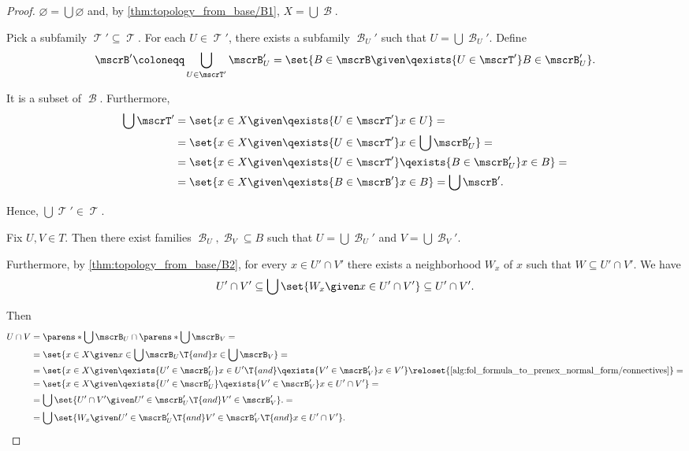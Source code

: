 \begin{proof}

   \( \varnothing = \bigcup \varnothing \) and, by \ref{thm:topology_from_base/B1}, \( X = \bigcup \mscrB \).

   Pick a subfamily \( \mscrT' \subseteq \mscrT \). For each \( U \in \mscrT' \), there exists a subfamily \( \mscrB_U' \) such that \( U = \bigcup \mscrB_U' \). Define
  \begin{equation*}
    \mscrB'
    \coloneqq
    \bigcup_{U \in \mscrT'} \mscrB_U'
    =
    \set{ B \in \mscrB \given \qexists {U \in \mscrT'} B \in \mscrB_U' }.
  \end{equation*}

  It is a subset of \( \mscrB \). Furthermore,
  \begin{align*}
    \bigcup \mscrT'
    &=
    \set{ x \in X \given \qexists{U \in \mscrT'} x \in U }
    = \\ &=
    \set{ x \in X \given \qexists{U \in \mscrT'} x \in \bigcup \mscrB_U' }
    = \\ &=
    \set{ x \in X \given \qexists{U \in \mscrT'} \qexists{B \in \mscrB_U'} x \in B }
    = \\ &=
    \set{ x \in X \given \qexists{B \in \mscrB'} x \in B }
    =
    \bigcup \mscrB'.
  \end{align*}

  Hence, \( \bigcup\mscrT' \in \mscrT \).

   Fix \( U, V \in T \). Then there exist families \( \mscrB_U, \mscrB_V \subseteq B \) such that \( U = \bigcup \mscrB_U' \) and \( V = \bigcup \mscrB_V' \).

  Furthermore, by \ref{thm:topology_from_base/B2}, for every \( x \in U' \cap V' \) there exists a neighborhood \( W_x \) of \( x \) such that \( W \subseteq U' \cap V' \). We have
  \begin{equation*}
    U' \cap V' \subseteq \bigcup\set{ W_x \given x \in U' \cap V' } \subseteq U' \cap V'.
  \end{equation*}

  Then
  \begin{align*}
    U \cap V
    &=
    \parens*{ \bigcup \mscrB_U } \cap \parens*{ \bigcup \mscrB_V }
    = \\ &=
    \set{ x \in X \given x \in \bigcup \mscrB_U \T{and} x \in \bigcup \mscrB_V }
    = \\ &=
    \set{ x \in X \given \qexists{ U' \in \mscrB_U' } x \in U' \T{and} \qexists{ V' \in \mscrB_V' } x \in V' }
    \reloset {\ref{alg:fol_formula_to_prenex_normal_form/connectives}} = \\ &=
    \set{ x \in X \given \qexists{ U' \in \mscrB_U' } \qexists{ V' \in \mscrB_V' } x \in U' \cap V' }
    = \\ &=
    \bigcup\set{ U' \cap V' \given U' \in \mscrB_U' \T{and} V' \in \mscrB_V' }.
    = \\ &=
    \bigcup\set{ W_x \given U' \in \mscrB_U' \T{and} V' \in \mscrB_V' \T{and} x \in U' \cap V' }.
  \end{align*}


\end{proof}
